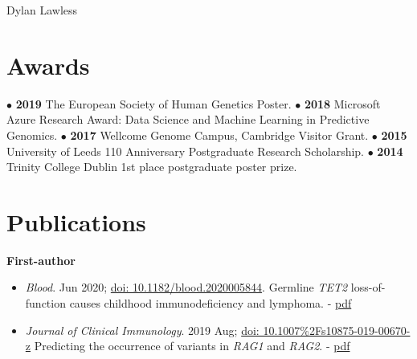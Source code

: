 \documentclass[11pt,a4paper]{article}
\begin{document}
\begin{cv}{Dylan Lawless}
\section*{Awards}
$\bullet$ \textbf{2019} The European Society of Human Genetics Poster.
$\bullet$ \textbf{2018} Microsoft Azure Research Award: Data Science and Machine Learning in Predictive Genomics. 
$\bullet$ \textbf{2017} Wellcome Genome Campus, Cambridge Visitor Grant.
$\bullet$ \textbf{2015} University of Leeds 110 Anniversary Postgraduate Research Scholarship.
$\bullet$ \textbf{2014} Trinity College Dublin 1st place postgraduate poster prize.

\section*{Publications}
\textbf{First-author}
\begin{itemize}[leftmargin=*]
\item \emph{Blood}. Jun 2020; 
\href{https://ashpublications.org/blood/article-abstract/136/9/1055/460739/Germline-TET2-loss-of-function-causes-childhood?redirectedFrom=fulltext}{doi: 10.1182/blood.2020005844}.
Germline \textit{TET2} loss-of-function causes childhood immunodeficiency and lymphoma.
- \href{https://lawlessgenomics.com/resume/pdf/2020BloodSpegarovaLawless_Germline\%20TET2\%20loss\%20of\%20function\%20causes\%20childhood\%20immunodeficiency\%20and\%20lymphoma.pdf}{pdf}


\item \emph{Journal of Clinical Immunology}. 2019 Aug;
\href{https://link.springer.com/article/10.1007\%2Fs10875-019-00670-z}{doi: 10.1007\%2Fs10875-019-00670-z}
Predicting the occurrence of variants in \textit{RAG1} and \textit{RAG2}. 
- \href{https://lawlessgenomics.com/resume/pdf/2019JOCILawless_Predicting_the_Occurrence_of_Variants_in_RAG1_and_RAG2.pdf}{pdf}



\end{itemize}
\end{cv}
\end{document}
